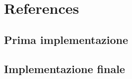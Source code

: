 \documentclass[../../docenti.tex]{subfiles}
\begin{document}
\section{References}

\subsection{Prima implementazione}

\subsection{Implementazione finale}
\end{document}
